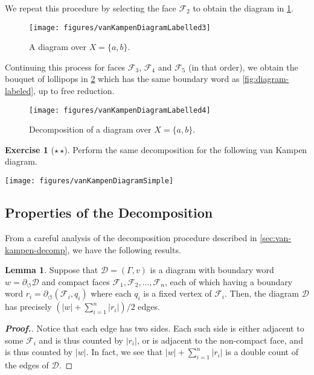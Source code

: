 \documentclass[11pt,a4paper,reqno]{amsart}
\theoremstyle{plain}
\theoremstyle{definition}
\newtheorem{lemma}[theorem]{Lemma}
\theoremstyle{definition}
\newtheorem{exercise}[theorem]{Exercise}
\newenvironment{myproof}{\begin{proof}[\normalfont\bfseries Proof.]}{\end{proof}}
\newcommand\exerciseLevelMedium{$\star${\,}$\star$}
\begin{document}
We repeat this procedure by selecting the face $\mathcal F_2$ to obtain the diagram in \cref{fig:diagram3}.

\begin{figure}[ht!]
	\centering
	\texttt{[image: figures/vanKampenDiagramLabelled3]}
	\caption{A diagram over $X = \{a,b\}$.}\label{fig:diagram3}
\end{figure}

Continuing this process for faces $\mathcal F_3$, $\mathcal F_4$ and $\mathcal F_5$ (in that order), we obtain the bouquet of lollipops in \cref{fig:diagram4}  which has the same boundary word as \cref{fig:diagram-labeled}, up to free reduction.

\begin{figure}[ht!]
	\centering
	\texttt{[image: figures/vanKampenDiagramLabelled4]}
	\caption{Decomposition of a diagram over $X = \{a,b\}$.}\label{fig:diagram4}
\end{figure}

\begin{exercise}[\exerciseLevelMedium]
	Perform the same decomposition for the following van Kampen diagram.

	\begin{center}
		\texttt{[image: figures/vanKampenDiagramSimple]}
	\end{center}
\end{exercise}

\subsection{Properties of the Decomposition}

From a careful analysis of the decomposition procedure described in \cref{sec:van-kampen-decomp}, we have the following results.

\begin{lemma}\label{lem:diagram-size}
	Suppose that $\mathcal D = (\Gamma,v)$ is a diagram with boundary word $w = \partial_\circlearrowleft \mathcal D$ and compact faces $\mathcal F_1, \mathcal F_2,\ldots,\mathcal F_n$, each of which having a boundary word $r_i = \partial_\circlearrowleft (\mathcal F_i, q_i)$ where each $q_i$ is a fixed vertex of $\mathcal F_i$.
	Then, the diagram $\mathcal D$ has precisely
	$
		\left(
		|w| + \sum_{i=1}^n |r_i|
		\right)/2
	$
	edges.
\end{lemma}

\begin{myproof}
	Notice that each edge has two sides.
	Each such side is either adjacent to some $\mathcal F_i$ and is thus counted by $|r_i|$, or is adjacent to the non-compact face, and is thus counted by $|w|$.
	In fact, we see that $|w|+\sum_{i=1}^n |r_i|$ is a double count of the edges of $\mathcal D$.
\end{myproof}
\end{document}
